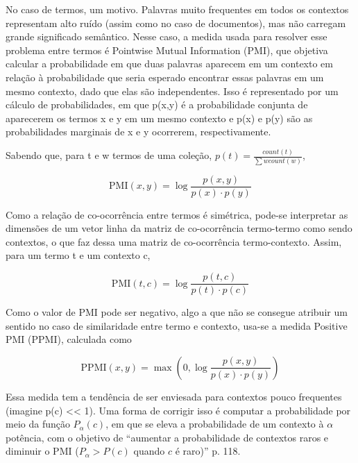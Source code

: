 \documentclass[
	12pt,				%
	openright,			%
	oneside,			%
	a4paper,			%
	english,			%
	french,				%
	spanish,			%
	brazil				%
	]{abntex2}
\begin{document}
No caso de termos, um motivo.
Palavras muito frequentes em todos os contextos representam alto ruído (assim como no caso de documentos), mas não carregam
grande significado semântico.
Nesse caso, a medida usada para resolver esse problema entre termos é Pointwise Mutual Information (PMI), que objetiva
calcular a probabilidade em que duas palavras aparecem em um contexto em relação à probabilidade que seria esperado encontrar essas palavras em um
mesmo contexto, dado que elas são independentes.
Isso é representado por um cálculo de probabilidades, em que p(x,y) é a probabilidade conjunta de aparecerem os termos x e y
em um mesmo contexto e p(x) e p(y) são as probabilidades marginais de x e y ocorrerem, respectivamente.

Sabendo que, para t e w termos de uma coleção, $p(t) = \frac{count(t)}{\sum{w}count(w)}$,

$$\text{PMI}(x, y) = \log \frac{p(x, y)}{p(x) \cdot p(y)}$$

Como a relação de co-ocorrência entre termos é simétrica, pode-se interpretar as dimensões de um vetor linha da matriz de co-ocorrência
termo-termo como sendo contextos, o que faz dessa uma matriz de co-ocorrência termo-contexto.
Assim, para um termo t e um contexto c,

$$\text{PMI}(t,c) = \log \frac{p(t,c)}{p(t) \cdot p(c)}$$

Como o valor de PMI pode ser negativo, algo a que não se consegue atribuir um sentido no caso de similaridade entre termo
e contexto, usa-se a medida Positive PMI (PPMI), calculada como

$$\text{PPMI}(x, y) = \max \left(0, \log \frac{p(x, y)}{p(x) \cdot p(y)}\right)$$

Essa medida tem a tendência de ser enviesada para contextos pouco frequentes (imagine p(c) << 1).
Uma forma de corrigir isso é computar a probabilidade por meio da função $P_{\alpha}(c)$, em que se eleva a probabilidade
de um contexto à $\alpha$ potência, com o objetivo de
``aumentar a probabilidade de contextos raros e diminuir o PMI ($P_{\alpha} > P(c)$ quando $c$ é raro)''
\cite{JurafskyMartin2023} p. 118.

\end{document}
